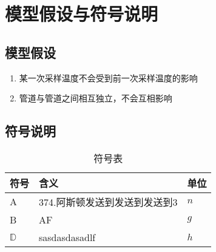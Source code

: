 \section{模型假设与符号说明}
    \subsection{模型假设}
        \begin{enumerate}
            \item 某一次采样温度不会受到前一次采样温度的影响
            \item 管道与管道之间相互独立，不会互相影响
        \end{enumerate}
    \subsection{符号说明}
    \begin{table}[H]
        \centering
        \begin{tabular}{ m{3cm}<{\centering}|m{8cm}<{\centering}|m{3cm}<{\centering}  }
            \hline
            符号&含义&单位\\
            \hline
            A&374.阿斯顿发送到发送到发送到3&  $n$\\
            B & AF&$g$\\
            $\mathbb{D}$ & sasdasdasadlf & $h$\\
            \hline
        \end{tabular}
        \caption{符号表}
    \end{table}